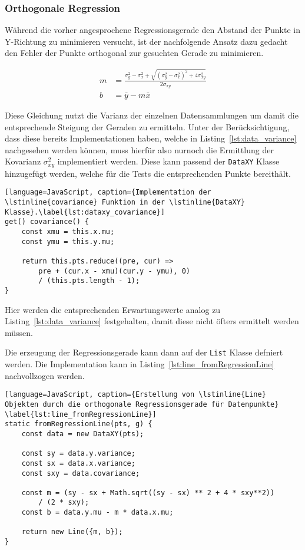 \subsubsection{Orthogonale Regression}\label{ch:orthogonale_regression}

Während die vorher angesprochene Regressionsgerade den Abstand der Punkte in Y-Richtung zu minimieren versucht, ist der nachfolgende Ansatz dazu gedacht den Fehler der Punkte orthogonal zur gesuchten Gerade zu minimieren.

\begin{equation}
    \begin{split}
        m &= \frac{\sigma_y^2 - \sigma_x^2 + \sqrt{(\sigma_y^2 - \sigma_x^2)^2 + 4\sigma_{xy}^2}}{2\sigma_{xy}} \\
        b &= \bar{y} - m \bar{x}
    \end{split}
    \label{eq:orthogonal_regression}
\end{equation}

Diese Gleichung nutzt die Varianz der einzelnen Datensammlungen um damit die entsprechende Steigung der Geraden zu ermitteln.
Unter der Berücksichtigung, dass diese bereits Implementationen haben, welche in Listing~\ref{lst:data_variance} nachgesehen werden können, muss hierfür also nurnoch die Ermittlung der Kovarianz $\sigma_{xy}^2$ implementiert werden.
Diese kann passend der \lstinline{DataXY} Klasse hinzugefügt werden, welche für die Tests die entsprechenden Punkte bereithält.

\begin{lstlisting}[language=JavaScript, caption={Implementation der \lstinline{covariance} Funktion in der \lstinline{DataXY} Klasse}.\label{lst:dataxy_covariance}]
get() covariance() {
    const xmu = this.x.mu;
    const ymu = this.y.mu;

    return this.pts.reduce((pre, cur) =>
        pre + (cur.x - xmu)(cur.y - ymu), 0)
        / (this.pts.length - 1);
}
\end{lstlisting}

Hier werden die entsprechenden Erwartungswerte analog zu Listing~\ref{lst:data_variance} festgehalten, damit diese nicht öfters ermittelt werden müssen.

Die erzeugung der Regressionsgerade kann dann auf der \lstinline{List} Klasse defniert werden.
Die Implementation kann in Listing~\ref{lst:line_fromRegressionLine} nachvollzogen werden.

\begin{lstlisting}[language=JavaScript, caption={Erstellung von \lstinline{Line} Objekten durch die orthogonale Regressionsgerade für Datenpunkte} \label{lst:line_fromRegressionLine}]
static fromRegressionLine(pts, g) {
    const data = new DataXY(pts);

    const sy = data.y.variance;
    const sx = data.x.variance;
    const sxy = data.covariance;

    const m = (sy - sx + Math.sqrt((sy - sx) ** 2 + 4 * sxy**2)) 
        / (2 * sxy);
    const b = data.y.mu - m * data.x.mu;

    return new Line({m, b});
}
\end{lstlisting}

